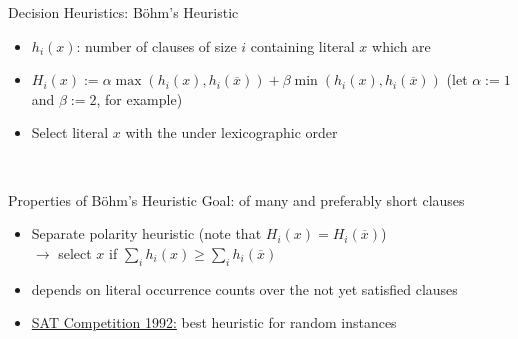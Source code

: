 \documentclass[t]{sdqbeamer}
\begin{document}
\begin{frame}{Decision Heuristics: Böhm's Heuristic}
\begin{itemize}\setlength{\itemsep}{1ex}
	\item $h_i(x)$: number of clauses of size $i$ containing literal $x$ which are 
	\item $H_i(x) := \alpha \operatorname{max}(h_i(x), h_i(\overline{x})) + \beta \operatorname{min}(h_i(x), h_i(\overline{x}))$ \quad (let $\alpha:=1$ and $\beta:=2$, for example)
	\item Select literal $x$ with the  under lexicographic order
\end{itemize}~\\
\begin{blueblock}{Properties of Böhm's Heuristic}
Goal:  of many and preferably short clauses\\[1ex]
\begin{itemize}\setlength{\itemsep}{1em}
	\item Separate polarity heuristic (note that $H_i(x) = H_i(\overline x)$)\\[1ex]
		$\rightarrow$ select $x$ if $\sum_i h_i(x) \geq \sum_i h_i(\overline x)$
	\item depends on literal occurrence counts over the not yet satisfied clauses
	\item \href{https://stamm-wilbrandt.de/en/Report_on_a_SAT_competition.pdf}{SAT Competition 1992:} best heuristic for random instances
\end{itemize}
\end{blueblock}
\end{frame}
	
\end{document}

